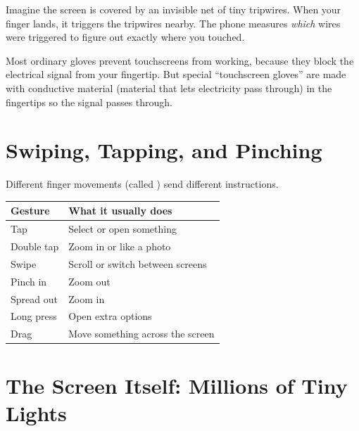 \begin{picturethis}
  Imagine the screen is covered by an invisible net of tiny tripwires.
  When your finger lands, it triggers the tripwires nearby.
  The phone measures \emph{which} wires were triggered to figure out
  exactly where you touched.
\end{picturethis}

\begin{funfact}
  Most ordinary gloves prevent touchscreens from working, because they block the electrical signal from your fingertip.
  But special ``touchscreen gloves'' are made with conductive material
  (material that lets electricity pass through)
  in the fingertips so the signal passes through.
\end{funfact}

\sectionrule

\section*{Swiping, Tapping, and Pinching}

Different finger movements (called ) send different instructions.

\begin{quickmap}
  \begin{center}
  \begin{tabular}{ll}
    \textbf{Gesture} & \textbf{What it usually does} \\
    \hline
    Tap             & Select or open something \\
    Double tap      & Zoom in or like a photo \\
    Swipe           & Scroll or switch between screens \\
    Pinch in        & Zoom out \\
    Spread out      & Zoom in \\
    Long press      & Open extra options \\
    Drag            & Move something across the screen \\
  \end{tabular}
  \end{center}
\end{quickmap}

\sectionrule

\section*{The Screen Itself: Millions of Tiny Lights}

